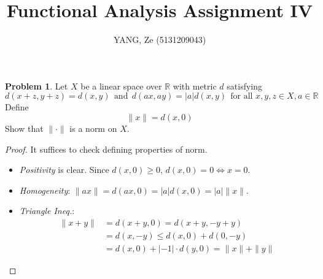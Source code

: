 \documentclass[a4paper, 10pt]{article}
\title{\textbf{Functional Analysis Assignment IV}}
\author{YANG, Ze (5131209043)}
\theoremstyle{definition}
\newtheorem{problem}{Problem}
\theoremstyle{hSol}
\begin{document}
\maketitle

\begin{problem} Let $X$ be a linear space over $\mathbb{R}$ with metric $d$ satisfying
$$d(x+z,y+z)=d(x,y)~~\text{and}~~d(ax,ay)=|a|d(x,y)~~\text{for all $x,y,z\in X, a\in \mathbb{R}$}$$
Define
$$\|x\|=d(x,0)$$
Show that $\|\cdot\|$ is a norm on $X$.
\end{problem}
\begin{proof} It suffices to check defining properties of norm.
\begin{itemize}
	\item[] \textit{Positivity} is clear. Since $d(x,0)\geq 0$, $d(x,0)=0 \iff x=0$.
	\item[] \textit{Homogeneity}: $\|ax\|=d(ax,0)=|a|d(x,0)=|a|\|x\|$.
	\item[] \textit{Triangle Ineq.}:
	\begin{equation}
		\begin{split}
		    \|x+y\| &= d(x+y, 0) = d(x+y, -y+y) \\
		    &= d(x,-y) \leq d(x,0)+d(0,-y) \\
		    &= d(x,0) + |-1|\cdot d(y,0) = \|x\| + \|y\|
		\end{split}
	\end{equation}
\end{itemize}
\end{proof}
\end{document}

